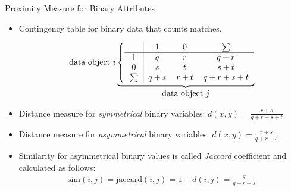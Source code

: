 \begin{frame}{Proximity Measure for Binary Attributes}
	\begin{itemize}
		\item Contingency table for binary data that counts matches.
		      \begin{center}
			      \vspace{-2em}
			      \[
				      \text{data object}~i\underbrace{
					      \left\{\begin{tabular}{ c | c c c }
						             & $1$   & $0$   & $\sum$    \\ \hline
						      $1$    & $q$   & $r$   & $q+r$     \\
						      $0$    & $s$   & $t$   & $s+t$     \\
						      $\sum$ & $q+s$ & $r+t$ & $q+r+s+t$
					      \end{tabular}\right.}_{\let\scriptstyle\textstyle\substack{\text{data object}~j}}
			      \]
		      \end{center}
		\item Distance measure for \textit{symmetrical} binary variables: $d(x,y) = \frac{r+s}{q+r+s+t}$
		\item Distance measure for \textit{asymmetrical} binary variables: $d(x,y) = \frac{r+s}{q+r+s}$
		\item Similarity for asymmetrical binary values is called \textit{Jaccard} coefficient and calculated as follows:
		      \begin{align*}
			      \text{sim}(i,j)=\text{jaccard}(i,j)=1-d(i,j)=\frac{q}{q+r+s}
		      \end{align*}
	\end{itemize}
\end{frame}

